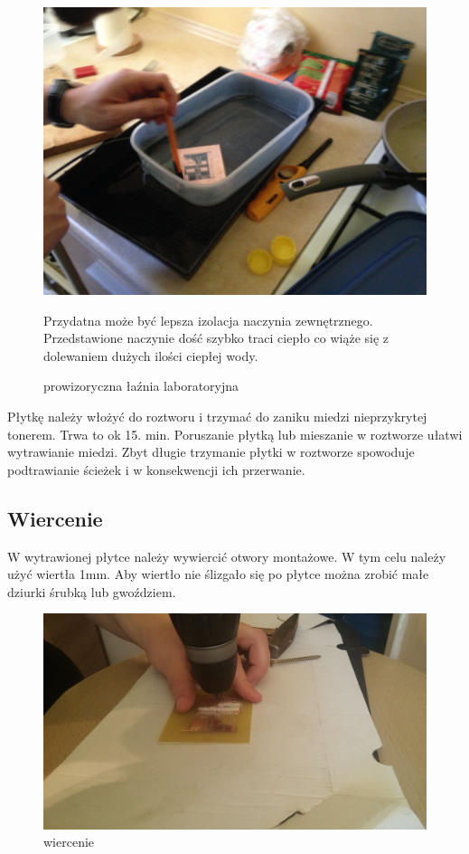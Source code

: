 \documentclass[a4paper,11pt]{article}
\def\SCALE{0.6}
\begin{document}
\begin{figure}[H]
	\centering
	\includegraphics[width=\SCALE
	\paperwidth]{wanienka}
	\caption{prowizoryczna łaźnia laboratoryjna}
	Przydatna może być lepsza izolacja naczynia zewnętrznego. Przedstawione naczynie dość szybko traci ciepło co wiąże się z dolewaniem dużych ilości ciepłej wody.
\end{figure}


Płytkę należy włożyć do roztworu i trzymać do zaniku miedzi nieprzykrytej tonerem. Trwa to ok 15. min. Poruszanie płytką lub mieszanie w roztworze ułatwi wytrawianie miedzi. Zbyt długie trzymanie płytki w roztworze spowoduje podtrawianie ścieżek i w konsekwencji ich przerwanie.

\subsection{Wiercenie}
W wytrawionej płytce należy wywiercić otwory montażowe. W tym celu należy użyć wiertła 1mm. Aby wiertło nie ślizgało się po płytce można zrobić małe dziurki śrubką lub gwoździem.
\begin{figure}[H]
	\centering
	\includegraphics[width=\SCALE
	\paperwidth]{wiercenie}
	\caption{wiercenie}
\end{figure}	
\end{document}
